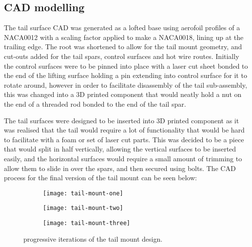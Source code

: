 \documentclass[../../main.tex]{subfiles}
\begin{document}
\subsection{CAD modelling} \label{sec:final-design-proposal:tail:cad-modelling}

The tail surface CAD was generated as a lofted base using aerofoil profiles of a NACA0012 with a scaling factor applied to make a NACA0018, lining up at the trailing edge.
The root was shortened to allow for the tail mount geometry, and cut-outs added for the tail spars, control surfaces and hot wire routes.
Initially the control surfaces were to be pinned into place with a laser cut sheet bonded to the end of the lifting surface holding a pin extending into control surface for it to rotate around, however in order to facilitate disassembly of the tail sub-assembly, this was changed into a 3D printed component that would neatly hold a nut on the end of a threaded rod bonded to the end of the tail spar.

The tail surfaces were designed to be inserted into 3D printed component as it was realised that the tail would require a lot of functionality that would be hard to facilitate with a foam or set of laser cut parts.
This was decided to be a piece that would split in half vertically, allowing the vertical surfaces to be inserted easily, and the horizontal surfaces would require a small amount of trimming to allow them to slide in over the spars, and then secured using bolts.
The CAD process for the final version of the tail mount can be seen below:


\begin{figure}[H]
    \centering
    \begin{subfigure}[b]{0.32\columnwidth}
        \centering
        \texttt{[image: tail-mount-one]}
        \caption{}
        \label{fig:tail-mount-progression:initial}
    \end{subfigure}
    \hfill
    \begin{subfigure}[b]{0.32\columnwidth}
        \centering
        \texttt{[image: tail-mount-two]}
        \caption{}
        \label{fig:tail-mount-progression:revised}
    \end{subfigure}
    \hfill
    \begin{subfigure}[b]{0.32\columnwidth}
        \centering
        \texttt{[image: tail-mount-three]}
        \caption{}
        \label{fig:tail-mount-progression:final}
    \end{subfigure}
    
    \caption{progressive iterations of the tail mount design.}
    \label{fig:tail-mount-progression}
\end{figure} 
\end{document}
